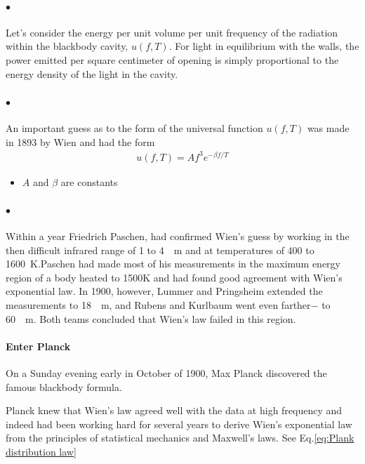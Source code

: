     \paragraph{$\bullet$} Let's consider the energy per unit volume per unit frequency of 
    the radiation within the blackbody cavity, $u( f, T )$. For light in equilibrium with 
    the walls, the power emitted per square centimeter of opening is simply proportional to 
    the energy density of the light in the cavity.

    \paragraph{$\bullet$} An important guess as to the form of the universal function $u(f, T)$ was
    made in 1893 by Wien and had the form 
    \begin{align} \label{Wien's exponential law}
        u(f,T) = A f^3 e^{- \beta f/T}
    \end{align}
    {\tiny \begin{itemize}
        \item $A$ and $\beta$ are constants
    \end{itemize}}

    \paragraph{$\bullet$} Within a year Friedrich Paschen, had confirmed Wien’s guess 
    by working in the then difficult infrared range of 1 to \SI{4}{\mu\m} and at temperatures 
    of 400 to \SI{1600}{\K}.Paschen had made most of his 
    measurements in the maximum energy region of a body heated to 1500K and had found good 
    agreement with Wien’s exponential law. In 1900, however, Lummer and Pringsheim extended 
    the measurements to \SI{18}{\mu\m}, and Rubens and Kurlbaum went even farther$-$ to \SI{60}{\mu\m}.
    Both teams concluded that Wien’s law failed in this region.

    \paragraph{\color{c3}Enter Planck}
    On a Sunday evening early in October of 1900, Max Planck discovered the famous blackbody formula.

    Planck knew that Wien’s law agreed well with the data at high frequency and indeed had been 
    working hard for several years to derive Wien’s exponential law from the principles of statistical 
    mechanics and Maxwell’s laws. See Eq.\eqref{eq:Plank distribution law}
    


